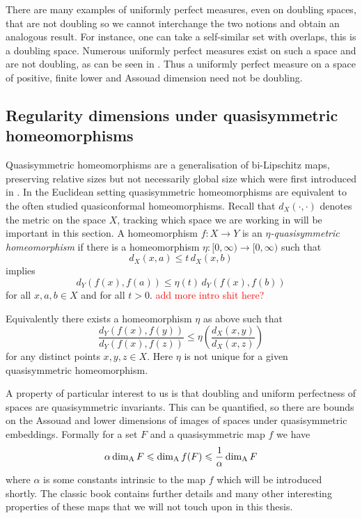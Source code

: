There are many examples of uniformly perfect measures, even on doubling spaces, that are not doubling so we cannot interchange the two notions and obtain an analogous result.  For instance, one can take a self-similar set with overlaps, this is a doubling space. Numerous uniformly perfect measures exist on such a space and are not doubling, as can be seen in \cite{hare-troscheit}. Thus a uniformly perfect measure on a space of positive, finite lower and Assouad dimension need not be doubling.




\subsection{Regularity dimensions under quasisymmetric homeomorphisms}\label{ch-quantifying:sec:quasi}


Quasisymmetric homeomorphisms are a generalisation of bi-Lipschitz maps, preserving relative sizes but not necessarily global size which were first introduced in \cite{ahlfors-beurling, tukia-vaisala}. In the Euclidean setting quasisymmetric homeomorphisms are equivalent to the often studied quasiconformal homeomorphisms. Recall that $d_X(\cdot,\cdot)$ denotes the metric on the space $X$, tracking which space we are working in will be important in this section. A homeomorphism $f\colon X \rightarrow Y$ is an \textit{$\eta$-quasisymmetric homeomorphism} if there is a homeomorphism $\eta \colon [0,\infty) \rightarrow [0,\infty)$ such that 
\[
d_X( x , a ) \le t \, d_X( x , b )
\]
implies 
\[
d_Y( f(x) , f(a) ) \le \eta(t) \, d_Y ( f(x) , f(b) )
\]
for all $x,a,b \in X$ and for all $t>0$.
\textcolor{red}{add more intro shit here?}

Equivalently there exists a homeomorphism $\eta$ as above such that 
\[
\frac{d_Y(f(x),f(y))}{d_Y(f(x),f(z))} \le \eta \left(\frac{d_X(x,y)}{d_X(x,z)} \right)
\]
for any distinct points $x,y,z \in X$. Here $\eta$ is not unique for a given quasisymmetric homeomorphism. 


A property of particular interest to us is that doubling and uniform perfectness of spaces are quasisymmetric invariants. This can be quantified, so there are bounds on the Assouad and lower dimensions of images of spaces under quasisymmetric embeddings. Formally for a set $F$ and a quasisymmetric map $f$ we have
\[
\alpha \dim_{\textup{A}} F \leqslant \dim_{\textup{A}} f(F) \leqslant \frac{1}{\alpha} \dim_{\textup{A}} F
\]
where $\alpha$ is some constants intrinsic to the map $f$ which will be introduced shortly. The classic book \cite{heinonen} contains further details and many other interesting properties of these maps that we will not touch upon in this thesis.

